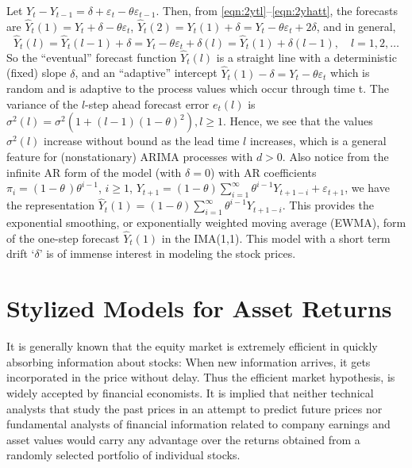 \begin{ex}
 Let $Y_t - Y_{t-1} = \delta + \varepsilon_t - \theta\varepsilon_{t-1}$. Then, from \eqref{eqn:2ytl}--\eqref{eqn:2yhatt}, the forecasts are $\hat{Y}_t(1) = Y_t + \delta -\theta\varepsilon_t$, $\hat{Y}_t(2) = Y_t(1) + \delta = Y_t -\theta\varepsilon_t + 2\delta$, and in general,
	\[
	\hat{Y}_t(l) = \hat{Y}_t(l-1) + \delta = Y_t - \theta\varepsilon_t + \delta(l) = \hat{Y}_t(1) + \delta(l-1),\quad l= 1, 2, \ldots
	\]
So the ``eventual'' forecast function $\hat{Y}_t(l)$ is a straight line with a deterministic (fixed) slope $\delta$, and an ``adaptive'' intercept $\hat{Y}_t(1) - \delta = Y_t - \theta \varepsilon_t$ which is random and is adaptive to the process values which occur through time t. The variance of the $l$-step ahead forecast error $e_t(l)$ is $\sigma^2(l) = \sigma^2 (1 + (l-1)(1-\theta)^2), l \geq1$. Hence, we see that the values $\sigma^2(l)$ increase without bound as the lead time $l$ increases, which is a general feature for (nonstationary) ARIMA processes with $d > 0$. Also notice from the infinite AR form of the model (with $\delta = 0$) with AR coefficients $\pi_i = (1-\theta\,)\theta^{i-1}$, $i \geq 1$, $Y_{t+1} = (1-\theta)\sum_{i=1}^\infty \theta^{i-1}Y_{t+1-i} + \varepsilon_{t+1}$, we have the representation $\hat{Y}_t(1) = (1-\theta)\sum_{i=1}^\infty \theta^{i-1} Y_{t+1-i}$. This provides the exponential smoothing, or exponentially weighted moving average (EWMA), form of the one-step forecast $\hat{Y}_t(1)$ in the IMA(1,1). This model with a short term drift `$\delta$' is of immense interest in modeling the stock prices. \xqed
\end{ex}



\section{Stylized Models for Asset Returns}


It is generally known that the equity market is extremely efficient in quickly absorbing information about stocks: When new information arrives, it gets incorporated in the price without delay. Thus the efficient market hypothesis, is widely accepted by financial economists. It is implied that neither technical analysts that study the past prices in an attempt to predict future prices nor fundamental analysts of financial information related to company earnings and asset values would carry any advantage over the returns obtained from a randomly selected portfolio of individual stocks.


